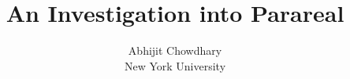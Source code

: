 \documentclass[12pt]{article}
\begin{document}
 
\title{An Investigation into Parareal}
\author{Abhijit Chowdhary \\ New York University} 

\maketitle

\tableofcontents
\clearpage









\end{document}
